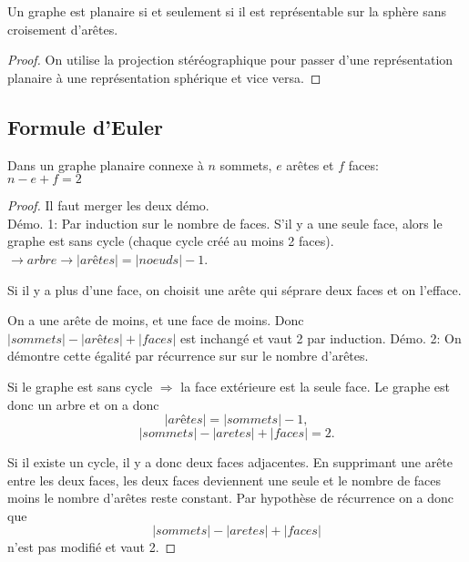 \begin{mytheo}
  Un graphe est planaire si et seulement si il est représentable sur la sphère sans croisement d'arêtes.
  \begin{proof}
  On utilise la projection stéréographique pour passer d'une représentation planaire à une représentation sphérique et vice versa.
  \end{proof}
\end{mytheo}

\subsection{Formule d'Euler}
\begin{mytheo} 
  Dans un graphe planaire connexe à $n$ sommets, $e$ arêtes et $f$ faces:\\
  $n−e+f =2$
  \begin{proof}
  Il faut merger les deux démo. \addTODO \\
  Démo. 1:
    Par induction sur le nombre de faces.
    S'il y a une seule face, alors le graphe est sans cycle (chaque cycle créé au moins 2 faces).
    $\rightarrow arbre \rightarrow |arêtes| = |noeuds|-1$.
    
    Si il y a plus d'une face, on choisit une arête qui séprare deux faces et on l'efface.
    
    On a une arête de moins, et une face de moins. Donc $|sommets| - |arêtes| + |faces|$ est inchangé et vaut 2 par induction.
  \newline
  Démo. 2:
    On démontre cette égalité par récurrence sur sur le nombre d'arêtes. 
    	
    Si le graphe est sans cycle $\Rightarrow$ la face extérieure est la seule face. Le graphe est donc un arbre et on a donc 
    $$|arêtes|= |sommets|-1,$$ 
    $$|sommets| - |aretes| + |faces|= 2.$$	
    
  Si il existe un cycle, il y a donc deux faces adjacentes. En supprimant une arête entre les deux faces, les deux faces deviennent une seule et le nombre de faces moins le nombre d'arêtes reste constant. Par hypothèse de récurrence on a donc que  
  $$|sommets| - |aretes| + |faces|$$ 
  n'est pas modifié et vaut 2.
  \end{proof}
\end{mytheo}

